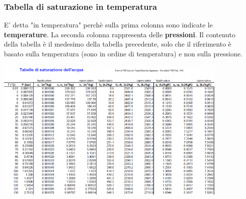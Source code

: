 \subsubsection{Tabella di saturazione in temperatura}
E' detta "in temperatura" perchè sulla prima colonna sono indicate le \textbf{temperature}.\newline
La seconda colonna rappresenta delle \textbf{pressioni}.\newline
\newline
Il contenuto della tabella è il medesimo della tabella precedente, solo che il riferimento è basato sulla temperatura (sono in ordine di temperatura) e non sulla pressione.
\begin{center}
    \includegraphics[height=7cm]{../L04/img11.PNG}
\end{center}
